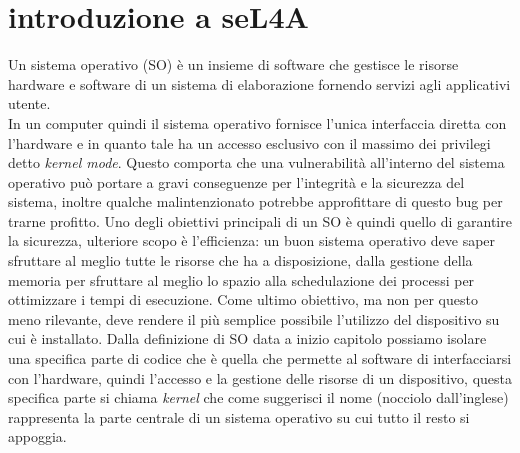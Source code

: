 \chapter{introduzione a seL4A}
Un sistema operativo (SO) è un insieme di software che gestisce le risorse hardware e software di un sistema di elaborazione fornendo servizi agli applicativi utente.\\
In un computer quindi il sistema operativo fornisce l'unica interfaccia diretta con l'hardware e in quanto tale ha un accesso esclusivo con il massimo dei privilegi detto \textit{kernel mode}. Questo comporta che una vulnerabilità all'interno del sistema operativo può portare a gravi conseguenze per l'integrità e la sicurezza del sistema, inoltre qualche malintenzionato potrebbe approfittare di questo bug per trarne profitto.
Uno degli obiettivi principali di un SO è quindi quello di garantire la sicurezza, ulteriore scopo è l'efficienza: un buon sistema operativo deve saper sfruttare al meglio tutte le risorse che ha a disposizione, dalla gestione della memoria per sfruttare al meglio lo spazio alla schedulazione dei processi per ottimizzare i tempi di esecuzione. Come ultimo obiettivo, ma non per questo meno rilevante, deve rendere il più semplice possibile l'utilizzo del dispositivo su cui è installato.
Dalla definizione di SO data a inizio capitolo possiamo isolare una specifica parte di codice che è quella che permette al software di interfacciarsi con l'hardware, quindi l'accesso e la gestione delle risorse di un dispositivo, questa specifica parte si chiama \textit{kernel} che come suggerisci il nome (nocciolo dall'inglese) rappresenta la parte centrale di un sistema operativo su cui tutto il resto si appoggia.\\
\newpage
